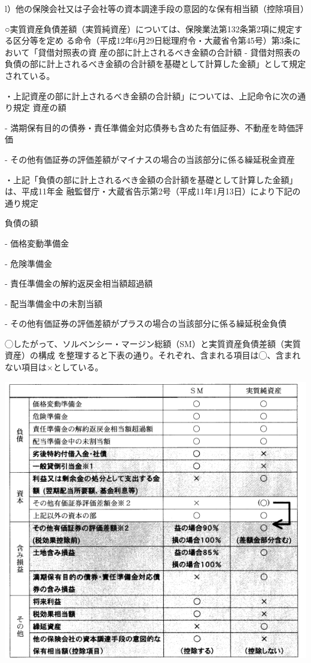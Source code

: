 \documentclass[report,gutter=10mm,fore-edge=10mm,uplatex,dvipdfmx]{jlreq}
\begin{document}
l）他の保険会社又は子会社等の資本調達手段の意図的な保有相当額（控除項目）

○実質資産負債差額（実質純資産）については、保険業法第132条第2項に規定する区分等を定め
る命令（平成12年6月29日総理府令・大蔵省令第45号）第3条において「貸借対照表の資
産の部に計上されるべき金額の合計額
 -  貸借対照表の負債の部に計上されるべき金額の合計額を基礎として計算した金額」として規定されている。

・上記資産の部に計上されるべき金額の合計額」については、上記命令に次の通り規定
資産の額

 - 満期保有目的の債券・責任準備金対応債券も含めた有価証券、不動産を時価評価

 - その他有価証券の評価差額がマイナスの場合の当該部分に係る繰延税金資産

・上記「負債の部に計上されるべき金額の合計額を基礎として計算した金額」は、平成11年金
融監督庁・大蔵省告示第2号（平成11年1月13日）により下記の通り規定

負債の額

 - 価格変動準備金

 - 危険準備金

 - 責任準備金の解約返戻金相当額超過額

 - 配当準備金中の未割当額

 - その他有価証券の評価差額がプラスの場合の当該部分に係る繰延税金負債

◯したがって、ソルベンシー・マージン総額（SM）と実質資産負債差額（実質資産）の構成
を整理すると下表の通り。それぞれ、含まれる項目は◯、含まれない項目は×としている。

\includegraphics[scale=0.8]{./images/ProbH16-2-3-SMandNetAsset.png}
\end{document}
